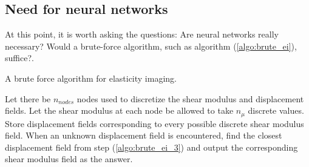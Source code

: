 \documentclass[12pt]{article}
\begin{document}
\subsection{Need for neural networks}
{At this point, it is worth asking the questions: Are neural networks really necessary? Would a brute-force algorithm, such as algorithm (\ref{algo:brute_ei}), suffice?.\par}
%
{\centering
\begin{minipage}{.9\linewidth}
  \begin{algorithm}[H]
    \caption{\label{algo:brute_ei}A brute force algorithm for elasticity imaging.}
    \begin{algorithmic}[1]
      \State Let there be $n_{nodes}$ nodes used to discretize the shear modulus and displacement fields.
      \State Let the shear modulus at each node be allowed to take $n_{\mu}$ discrete values.
      \State \label{algo:brute_ei_3}Store displacement fields corresponding to every possible discrete shear modulus field. 
      \State \label{algo:brute_ei_4}When an unknown displacement field is encountered, find the closest displacement field from step (\ref{algo:brute_ei_3}) and output the corresponding shear modulus field as the answer.
    \end{algorithmic}    
 \end{algorithm}
\end{minipage}
\par
}
\end{document}
